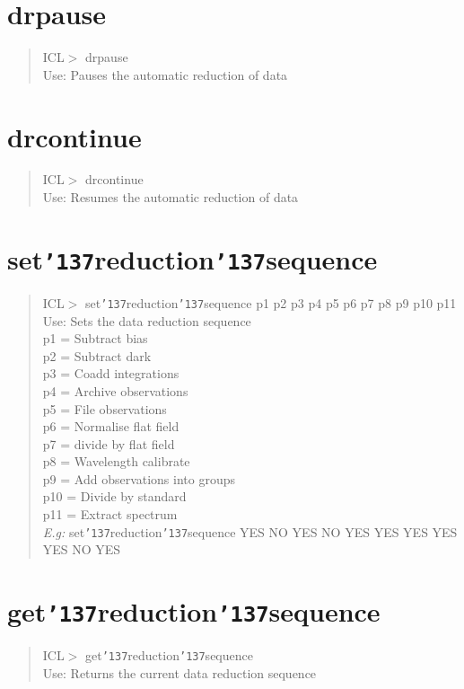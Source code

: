 \documentclass[a4paper]{book}
\renewcommand{\_}{{\tt\char'137}}
\begin{document}
\section{drpause}
\begin{quote}
ICL$>$ drpause \\
Use: Pauses the automatic reduction of data
\end{quote}
\section{drcontinue}
\begin{quote}
ICL$>$ drcontinue \\
Use: Resumes the automatic reduction of data
\end{quote}
\section{set\_reduction\_sequence}
\begin{quote}
ICL$>$ set\_reduction\_sequence p1 p2 p3 p4 p5 p6 p7 p8 p9 p10 p11 \\
Use: Sets the data reduction sequence \\
p1 = Subtract bias \\
p2 = Subtract dark \\
p3 = Coadd integrations \\
p4 = Archive observations \\
p5 = File observations \\
p6 = Normalise flat field \\
p7 = divide by flat field \\
p8 = Wavelength calibrate \\
p9 = Add observations into groups \\
p10 = Divide by standard \\
p11 = Extract spectrum \\
{\em E.g:} set\_reduction\_sequence YES NO YES NO YES YES YES YES YES NO YES
\end{quote}

\section{get\_reduction\_sequence}
\begin{quote}
ICL$>$ get\_reduction\_sequence \\
Use: Returns the current data reduction sequence
\end{quote}
\end{document}
